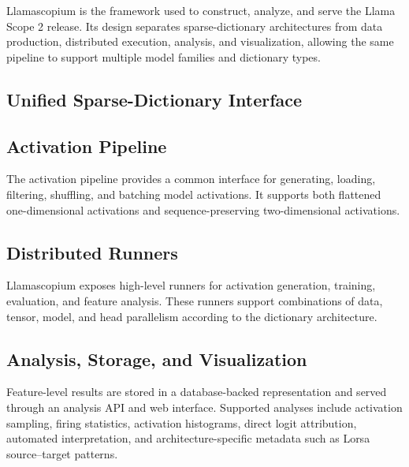 \documentclass{article}
\begin{document}
Llamascopium is the framework used to construct, analyze, and serve the Llama
Scope 2 release. Its design separates sparse-dictionary architectures from data
production, distributed execution, analysis, and visualization, allowing the
same pipeline to support multiple model families and dictionary types.

\subsection{Unified Sparse-Dictionary Interface}


\subsection{Activation Pipeline}

The activation pipeline provides a common interface for generating, loading,
filtering, shuffling, and batching model activations. It supports both flattened
one-dimensional activations and sequence-preserving two-dimensional
activations.

\subsection{Distributed Runners}

Llamascopium exposes high-level runners for activation generation, training,
evaluation, and feature analysis. These runners support combinations of data,
tensor, model, and head parallelism according to the dictionary architecture.

\subsection{Analysis, Storage, and Visualization}

Feature-level results are stored in a database-backed representation and served
through an analysis API and web interface. Supported analyses include
activation sampling, firing statistics, activation histograms, direct logit
attribution, automated interpretation, and architecture-specific metadata such
as Lorsa source--target patterns.
\end{document}
